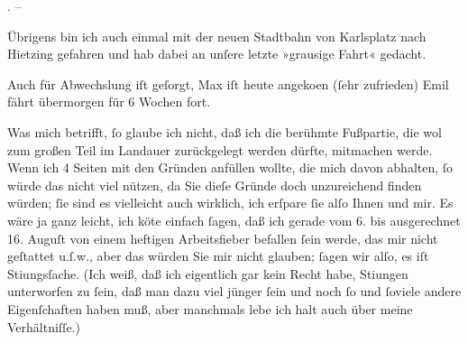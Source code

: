                \label{K_L04297-3v}\label{K_L04297-3}. –\pend
           
\pstart
           Übrigens bin ich auch einmal mit der neuen Stadtbahn von Karlsplatz nach Hietzing gefahren und hab dabei an unſere letzte
               »grausige Fahrt« gedacht.\pend
           
\pstart
           Auch für Abwechslung iſt geſorgt, Max iſt
               heute angeko{\geminationm}en (ſehr zufrieden) Emil fährt übermorgen für 6 Wochen fort.\pend
           
\pstart
           Was mich betrifft,{ }ſo glaube ich nicht, daß ich die berühmte Fußpartie, {\pb}die wol zum großen Teil im Landauer
               zurückgelegt werden dürfte, mitmachen werde. Wenn ich 4 Seiten mit den Gründen
               anfüllen wollte, die mich davon abhalten,{ }ſo würde das nicht viel nützen, da Sie
               dieſe Gründe doch unzureichend finden würden;{ }ſie sind es vielleicht auch wirklich,
               ich erſpare{ }ſie alſo Ihnen und mir. Es wäre ja ganz leicht, ich kö{\geminationn}te einfach{ }ſagen, daß ich gerade vom 6.
               bis ausgerechnet 16. Auguſt von einem heftigen Arbeitsfieber befallen{ }ſein werde, das mir nicht geſtattet u.ſ.w., aber das würden Sie mir nicht glauben;{ }ſagen wir alſo, es iſt Sti{\geminationm}ungsſache. (Ich weiß, daß ich
               eigentlich gar kein Recht habe, Sti{\geminationm}ungen unterworfen zu{ }ſein, daß man dazu viel jünger{ }ſein und noch{ }ſo und{ }ſoviele andere Eigenſchaften
               haben muß, aber manchmals lebe ich halt auch über meine Verhältniſſe.)\pend
           
